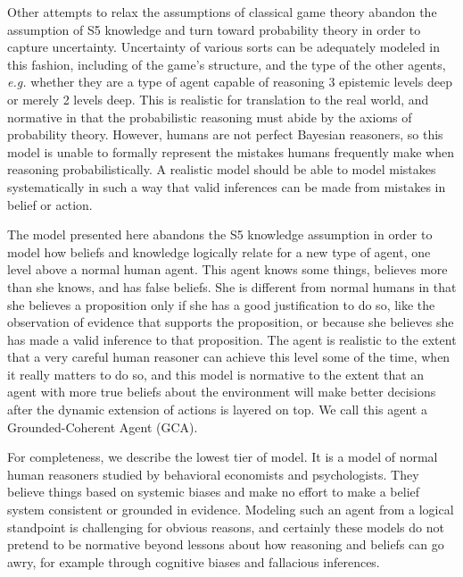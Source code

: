 

Other attempts to relax the assumptions of classical game theory abandon the assumption of S5 knowledge and turn toward probability theory in order to capture uncertainty. Uncertainty of various sorts can be adequately modeled in this fashion, including of the game's structure, and the type of the other agents, \emph{e.g.} whether they are a type of agent capable of reasoning 3 epistemic levels deep or merely 2 levels deep. This is realistic for translation to the real world, and normative in that the probabilistic reasoning must abide by the axioms of probability theory. However, humans are not perfect Bayesian reasoners, so this model is unable to formally represent the mistakes humans frequently make when reasoning probabilistically. A realistic model should be able to model mistakes systematically in such a way that valid inferences can be made from mistakes in belief or action.

The model presented here abandons the S5 knowledge assumption in order to model how beliefs and knowledge logically relate for a new type of agent, one level above a normal human agent. This agent knows some things, believes more than she knows, and has false beliefs. She is different from normal humans in that she believes a proposition only if she has a good justification to do so, like the observation of evidence that supports the proposition, or because she believes she has made a valid inference to that proposition. The agent is realistic to the extent that a very careful human reasoner can achieve this level some of the time, when it really matters to do so, and this model is normative to the extent that an agent with more true beliefs about the environment will make better decisions after the dynamic extension of actions is layered on top. We call this agent a Grounded-Coherent Agent (GCA).

For completeness, we describe the lowest tier of model. It is a model of normal human reasoners studied by behavioral economists and psychologists. They believe things based on systemic biases and make no effort to make a belief system consistent or grounded in evidence. Modeling such an agent from a logical standpoint is challenging for obvious reasons, and certainly these models do not pretend to be normative beyond lessons about how reasoning and beliefs can go awry, for example through cognitive biases and fallacious inferences. 

